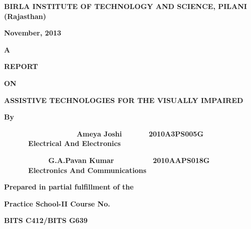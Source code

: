 \documentclass[11pt]{report}
\begin{document}
\bigskip

{\centering{}\bfseries
BIRLA INSTITUTE OF TECHNOLOGY AND SCIENCE, PILANI
(Rajasthan)
\par}


\bigskip

{\centering{}\bfseries
November, 2013
\par}


\bigskip


\bigskip


\bigskip


\bigskip


\bigskip


\bigskip


\bigskip


\bigskip


\bigskip
\newpage
{\centering{}\bfseries
A
\par}

{\centering{}\bfseries
REPORT
\par}

{\centering{}\bfseries
ON
\par}

{\centering{}\bfseries
ASSISTIVE TECHNOLOGIES FOR THE VISUALLY IMPAIRED
\par}

\bigskip


\bigskip


\bigskip


\bigskip

{\centering{}\bfseries
By
\par}


\bigskip

{\bfseries
\ \ \ \ \ \ \ \ \ \ \ \ \ \ \ \ \ \ Ameya Joshi \ \ \ \ \ \ 2010A3PS005G
\ \ \ \ \ \ Electrical And Electronics\ \  }

{\bfseries
\ \ \ \ \ \ \ \ \ \ \  G.A.Pavan Kumar \ \ \ \ \ \ \ \ \ 2010AAPS018G
\ \ \ \ \ \ Electronics And Communications\ \  }
\bigskip

{\centering{}\bfseries
Prepared in partial fulfillment of the
\par}

{\centering{}\bfseries
Practice School-II Course No.
\par}

{\centering{}\bfseries
BITS C412/BITS G639
\par}
\end{document}
